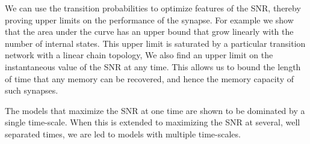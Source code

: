 \documentclass[12pt]{article}
\begin{document}
We can use the transition probabilities to optimize features of the SNR, thereby proving upper limits on the performance of the synapse.
For example we show that the area under the curve has an upper bound that grow linearly with the number of internal states.
This upper limit is saturated by a particular transition network with a linear chain topology,
We also find an upper limit on the instantaneous value of the SNR at any time.
This allows us to bound the length of time that any memory can be recovered, and hence the memory capacity of such synapses.

The models that maximize the SNR at one time are shown to be dominated by a single time-scale.
When this is extended to maximizing the SNR at several, well separated times, we are led to models with multiple time-scales.




%
\end{document}
